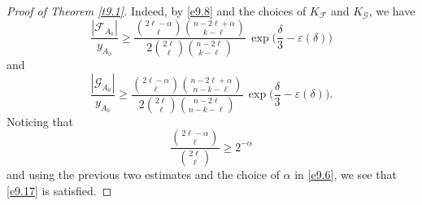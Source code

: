 \documentclass[10pt]{amsart}
\theoremstyle{remark}
\newcommand{\meg}{\geqslant}
\newcommand{\Fcal}{\mathcal{F}}
\newcommand{\Gcal}{\mathcal{G}}
\begin{document}
\begin{proof}[Proof of Theorem \emph{\ref{t9.1}}]
Indeed, by \eqref{e9.8} and the choices of $K_{\mathcal{F}}$ and $K_{\mathcal{G}}$, we have
\begin{equation} \label{en9.11}
\frac{|\Fcal_{A_0}|}{y_{A_0}}\meg \frac{\binom{2\ell-\alpha}{\ell}\binom{n-2\ell+\alpha}{k-\ell}}{2\binom{2\ell}{\ell}
\binom{n-2\ell}{k-\ell}} \, \exp\Big(\frac{\delta}{3}-\varepsilon(\delta)\Big)
\end{equation}
and
\begin{equation} \label{en9.12}
\frac{|\Gcal_{A_0}|}{y_{A_0}}\meg \frac{\binom{2\ell-\alpha}{\ell}\binom{n-2\ell+\alpha}{n-k-\ell}}{2\binom{2\ell}{\ell}
\binom{n-2\ell}{n-k-\ell}}\, \exp\Big(\frac{\delta}{3}-\varepsilon(\delta)\Big).
\end{equation}
Noticing that
\begin{equation} \label{en9.13}
\frac{\binom{2\ell-\alpha}{\ell}}{\binom{2\ell}{\ell}}\meg 2^{-\alpha}
\end{equation}
and using the previous two estimates and the choice of $\alpha$ in \eqref{e9.6}, we see that \eqref{e9.17} is satisfied.


\end{proof}
\end{document}
